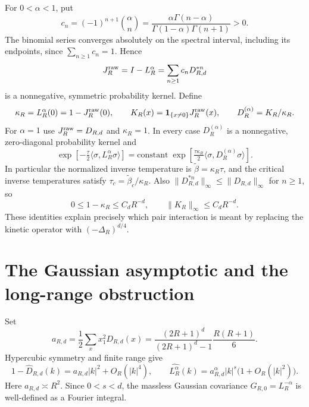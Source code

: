 \documentclass[11pt]{article}
\begin{document}
For \(0<\alpha<1\), put
\[
 c_n=(-1)^{n+1}\binom\alpha n
 =\frac{\alpha\Gamma(n-\alpha)}
        {\Gamma(1-\alpha)\Gamma(n+1)}>0.
\]
The binomial series converges absolutely on the spectral interval,
including its endpoints, since \(\sum_{n\ge1}c_n=1\). Hence
\begin{equation}\label{frac:binomial}
 J_R^{\rm raw}=I-L_R^\alpha
       =\sum_{n\ge1}c_nD_{R,d}^{*n}
\end{equation}
is a nonnegative, symmetric probability kernel. Define
\[
 \kappa_R=L_R^\alpha(0)=1-J_R^{\rm raw}(0),\qquad
 K_R(x)=\boldsymbol1_{\{x\ne0\}}J_R^{\rm raw}(x),\qquad
 D_R^{(\alpha)}=K_R/\kappa_R.
\]
For \(\alpha=1\) use \(J_R^{\rm raw}=D_{R,d}\) and
\(\kappa_R=1\). In every case \(D_R^{(\alpha)}\) is a
nonnegative, zero-diagonal probability kernel and
\begin{equation}\label{frac:normalization}
 \exp[-\tfrac\tau2\langle\sigma,L_R^\alpha\sigma\rangle]
 =\text{constant}\;
   \exp[\tfrac{\tau\kappa_R}{2}
                     \langle\sigma,D_R^{(\alpha)}\sigma\rangle].
\end{equation}
In particular the normalized inverse temperature is
\(\widetilde\beta=\kappa_R\tau\), and the critical inverse
temperatures satisfy
\(\tau_c=\widetilde\beta_c/\kappa_R\).
Also \(\|D_{R,d}^{*n}\|_\infty\le\|D_{R,d}\|_\infty\)
for \(n\ge1\), so
\[
 0\le1-\kappa_R\le C_dR^{-d},\qquad
 \|K_R\|_\infty\le C_dR^{-d}.
\]
These identities explain precisely which pair interaction is meant
by replacing the kinetic operator with \((-\Delta_R)^{d/4}\).

\section{The Gaussian asymptotic and the long-range obstruction}
\label{frac:gaussian}

Set
\[
 a_{R,d}=\frac12\sum_x x_1^2D_{R,d}(x)
 =\frac{(2R+1)^d}{(2R+1)^d-1}\frac{R(R+1)}6.
\]
Hypercubic symmetry and finite range give
\begin{equation}\label{frac:symbol}
 1-\widehat D_{R,d}(k)=a_{R,d}|k|^2+O_R(|k|^4),\qquad
 \widehat{L_R^\alpha}(k)
   =a_{R,d}^{\alpha}|k|^s
           \bigl(1+O_R(|k|^2)\bigr).
\end{equation}
Here \(a_{R,d}\asymp R^2\). Since \(0<s<d\), the massless
Gaussian covariance \(G_{R,0}=L_R^{-\alpha}\) is well-defined
as a Fourier integral.
\end{document}
